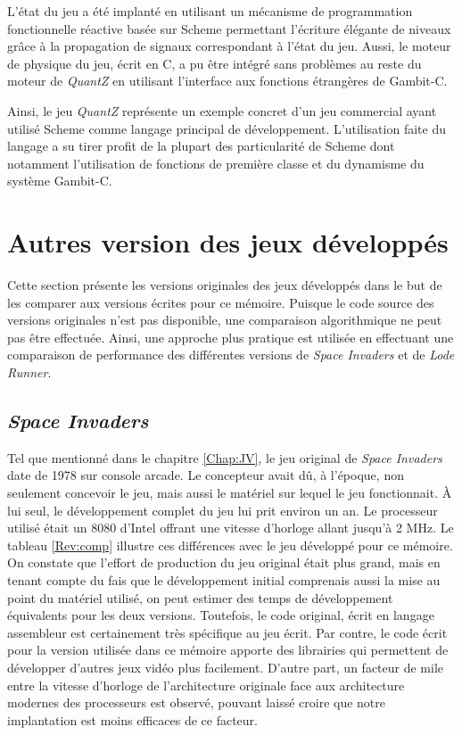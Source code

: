 \documentclass[12pt,twoside,letterpaper,francais]{book}
\begin{document}
L'état du jeu a été implanté en utilisant un mécanisme de
programmation fonctionnelle réactive basée sur Scheme permettant
l'écriture élégante de niveaux grâce à la propagation de signaux
correspondant à l'état du jeu. Aussi, le moteur de physique du jeu,
écrit en C, a pu être intégré sans problèmes au reste du moteur de
\textit{QuantZ} en utilisant l'interface aux fonctions étrangères de
Gambit-C.

Ainsi, le jeu \textit{QuantZ} représente un exemple concret d'un jeu
commercial ayant utilisé Scheme comme langage principal de
dévelop\-pement. L'utilisation faite du langage a su tirer profit de
la plupart des particularité de Scheme dont notamment l'utilisation de
fonctions de première classe et du dynamisme du système Gambit-C.

\FloatBarrier
\section{Autres version des jeux développés}
\label{Rev:comp-section}

Cette section présente les versions originales des jeux développés
dans le but de les comparer aux versions écrites pour ce
mémoire. Puisque le code source des versions originales n'est pas
disponible, une comparaison algorithmique ne peut pas être
effectuée. Ainsi, une approche plus pratique est utilisée en
effectuant une comparaison de performance des différentes versions de
\textit{Space Invaders} et de \textit{Lode Runner}.

\subsection{\textit{Space Invaders}}

Tel que mentionné dans le chapitre \ref{Chap:JV}, le jeu original de
\textit{Space Invaders} date de 1978 sur console arcade.  Le
concepteur avait dû, à l'époque, non seulement concevoir le jeu, mais
aussi le matériel sur lequel le jeu fonctionnait. À lui seul, le
développement complet du jeu lui prit environ un an. Le processeur
utilisé était un 8080 d'Intel offrant une vitesse d'horloge allant
jusqu'à 2 MHz. Le tableau \ref{Rev:comp} illustre ces différences avec
le jeu développé pour ce mémoire. On constate que l'effort de
production du jeu original était plus grand, mais en tenant compte du
fais que le développement initial comprenais aussi la mise au point du
matériel utilisé, on peut estimer des temps de développement
équivalents pour les deux versions. Toutefois, le code original, écrit
en langage assembleur est certainement très spécifique au jeu écrit.
Par contre, le code écrit pour la version utilisée dans ce mémoire
apporte des librairies qui permettent de développer d'autres jeux
vidéo plus facilement. D'autre part, un facteur de mile entre la
vitesse d'horloge de l'architecture originale face aux architecture
modernes des processeurs est observé, pouvant laissé croire que notre
implantation est moins efficaces de ce facteur.
\end{document}
